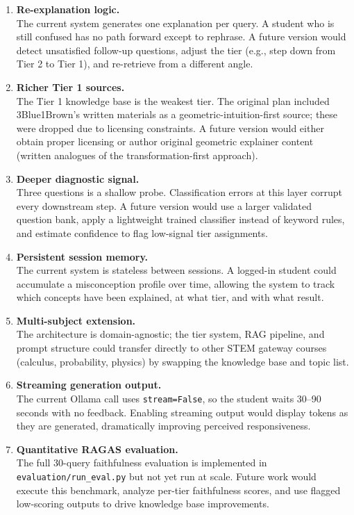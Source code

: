 \documentclass[11pt]{article}
\begin{document}
\begin{enumerate}[leftmargin=*, label=\textbf{\arabic*.}]

\item \textbf{Re-explanation logic.}\\
The current system generates one explanation per query. A student who is still confused has no path forward except to rephrase. A future version would detect unsatisfied follow-up questions, adjust the tier (e.g., step down from Tier 2 to Tier 1), and re-retrieve from a different angle.

\item \textbf{Richer Tier 1 sources.}\\
The Tier 1 knowledge base is the weakest tier. The original plan included 3Blue1Brown's written materials as a geometric-intuition-first source; these were dropped due to licensing constraints. A future version would either obtain proper licensing or author original geometric explainer content (written analogues of the transformation-first approach).

\item \textbf{Deeper diagnostic signal.}\\
Three questions is a shallow probe. Classification errors at this layer corrupt every downstream step. A future version would use a larger validated question bank, apply a lightweight trained classifier instead of keyword rules, and estimate confidence to flag low-signal tier assignments.

\item \textbf{Persistent session memory.}\\
The current system is stateless between sessions. A logged-in student could accumulate a misconception profile over time, allowing the system to track which concepts have been explained, at what tier, and with what result.

\item \textbf{Multi-subject extension.}\\
The architecture is domain-agnostic; the tier system, RAG pipeline, and prompt structure could transfer directly to other STEM gateway courses (calculus, probability, physics) by swapping the knowledge base and topic list.

\item \textbf{Streaming generation output.}\\
The current Ollama call uses \texttt{stream=False}, so the student waits 30--90 seconds with no feedback. Enabling streaming output would display tokens as they are generated, dramatically improving perceived responsiveness.

\item \textbf{Quantitative RAGAS evaluation.}\\
The full 30-query faithfulness evaluation is implemented in \texttt{evaluation/run\_eval.py} but not yet run at scale. Future work would execute this benchmark, analyze per-tier faithfulness scores, and use flagged low-scoring outputs to drive knowledge base improvements.

\end{enumerate}
\end{document}
